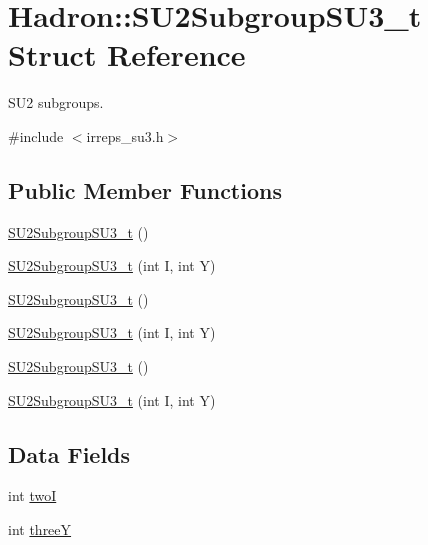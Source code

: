 \hypertarget{structHadron_1_1SU2SubgroupSU3__t}{}\section{Hadron\+:\+:S\+U2\+Subgroup\+S\+U3\+\_\+t Struct Reference}
\label{structHadron_1_1SU2SubgroupSU3__t}


S\+U2 subgroups.  




{\ttfamily \#include $<$irreps\+\_\+su3.\+h$>$}

\subsection*{Public Member Functions}
\begin{DoxyCompactItemize}
\item 
\mbox{\hyperlink{structHadron_1_1SU2SubgroupSU3__t_aebd2bbbecf62f223ec0efa5a4954e7ba}{S\+U2\+Subgroup\+S\+U3\+\_\+t}} ()
\item 
\mbox{\hyperlink{structHadron_1_1SU2SubgroupSU3__t_a26fbf2f4603e560c703931e13d5e0af5}{S\+U2\+Subgroup\+S\+U3\+\_\+t}} (int I, int Y)
\item 
\mbox{\hyperlink{structHadron_1_1SU2SubgroupSU3__t_aebd2bbbecf62f223ec0efa5a4954e7ba}{S\+U2\+Subgroup\+S\+U3\+\_\+t}} ()
\item 
\mbox{\hyperlink{structHadron_1_1SU2SubgroupSU3__t_a26fbf2f4603e560c703931e13d5e0af5}{S\+U2\+Subgroup\+S\+U3\+\_\+t}} (int I, int Y)
\item 
\mbox{\hyperlink{structHadron_1_1SU2SubgroupSU3__t_aebd2bbbecf62f223ec0efa5a4954e7ba}{S\+U2\+Subgroup\+S\+U3\+\_\+t}} ()
\item 
\mbox{\hyperlink{structHadron_1_1SU2SubgroupSU3__t_a26fbf2f4603e560c703931e13d5e0af5}{S\+U2\+Subgroup\+S\+U3\+\_\+t}} (int I, int Y)
\end{DoxyCompactItemize}
\subsection*{Data Fields}
\begin{DoxyCompactItemize}
\item 
int \mbox{\hyperlink{structHadron_1_1SU2SubgroupSU3__t_a545b54ec733cee39969e152dd9b18c3f}{twoI}}
\item 
int \mbox{\hyperlink{structHadron_1_1SU2SubgroupSU3__t_aee956c5cda78da686316083413d70bec}{threeY}}
\end{DoxyCompactItemize}


